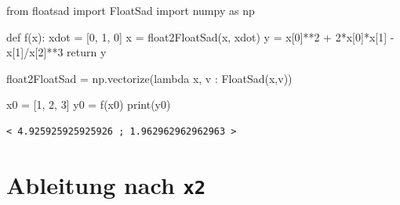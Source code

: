 \documentclass[
  a4paper,
  DIV=11]{scrreprt}
\newenvironment{Shaded}{\begin{snugshade}}{\end{snugshade}}
\newcommand{\BuiltInTok}[1]{\textcolor[rgb]{0.00,0.23,0.31}{#1}}
\newcommand{\ControlFlowTok}[1]{\textcolor[rgb]{0.00,0.23,0.31}{#1}}
\newcommand{\DecValTok}[1]{\textcolor[rgb]{0.68,0.00,0.00}{#1}}
\newcommand{\ImportTok}[1]{\textcolor[rgb]{0.00,0.46,0.62}{#1}}
\newcommand{\KeywordTok}[1]{\textcolor[rgb]{0.00,0.23,0.31}{#1}}
\newcommand{\NormalTok}[1]{\textcolor[rgb]{0.00,0.23,0.31}{#1}}
\newcommand{\OperatorTok}[1]{\textcolor[rgb]{0.37,0.37,0.37}{#1}}
\theoremstyle{definition}
\theoremstyle{definition}
\theoremstyle{remark}
\begin{document}
\begin{Shaded}
\begin{Highlighting}[]
\ImportTok{from}\NormalTok{ floatsad }\ImportTok{import}\NormalTok{ FloatSad}
\ImportTok{import}\NormalTok{ numpy }\ImportTok{as}\NormalTok{ np}

\KeywordTok{def}\NormalTok{ f(x):}
\NormalTok{    xdot }\OperatorTok{=}\NormalTok{ [}\DecValTok{0}\NormalTok{, }\DecValTok{1}\NormalTok{, }\DecValTok{0}\NormalTok{]}
\NormalTok{    x }\OperatorTok{=}\NormalTok{ float2FloatSad(x, xdot)}
\NormalTok{    y }\OperatorTok{=}\NormalTok{ x[}\DecValTok{0}\NormalTok{]}\OperatorTok{**}\DecValTok{2} \OperatorTok{+} \DecValTok{2}\OperatorTok{*}\NormalTok{x[}\DecValTok{0}\NormalTok{]}\OperatorTok{*}\NormalTok{x[}\DecValTok{1}\NormalTok{] }\OperatorTok{{-}}\NormalTok{ x[}\DecValTok{1}\NormalTok{]}\OperatorTok{/}\NormalTok{x[}\DecValTok{2}\NormalTok{]}\OperatorTok{**}\DecValTok{3}
    \ControlFlowTok{return}\NormalTok{ y}

\NormalTok{float2FloatSad }\OperatorTok{=}\NormalTok{ np.vectorize(}\KeywordTok{lambda}\NormalTok{ x, v : FloatSad(x,v))}

\NormalTok{x0 }\OperatorTok{=}\NormalTok{ [}\DecValTok{1}\NormalTok{, }\DecValTok{2}\NormalTok{, }\DecValTok{3}\NormalTok{]}
\NormalTok{y0 }\OperatorTok{=}\NormalTok{ f(x0)}
\BuiltInTok{print}\NormalTok{(y0)}
\end{Highlighting}
\end{Shaded}

\begin{verbatim}
< 4.925925925925926 ; 1.962962962962963 >
\end{verbatim}

\section{\texorpdfstring{Ableitung nach \texttt{x2}}{Ableitung nach x2}}
\end{document}
